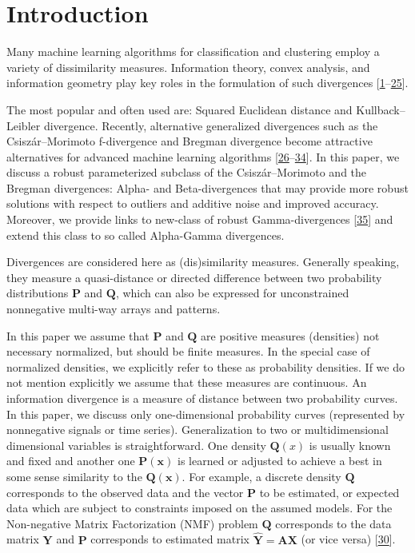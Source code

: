 \setcounter{section}{0}
\section{\texorpdfstring{Introduction}{Introduction}}
\label{sec1-entropy-12-01532}
Many machine learning algorithms for classification and clustering employ a variety of dissimilarity measures. Information theory, convex analysis, and information geometry play key roles in the formulation of such divergences [\hyperlink{B1-entropy-12-01532}{1}--\hyperlink{B25-entropy-12-01532}{25}].


The most popular and often used are: Squared Euclidean distance and Kullback–Leibler divergence. Recently, alternative generalized divergences such as the Csiszár–Morimoto f-divergence and Bregman divergence become attractive alternatives for advanced machine learning algorithms [\hyperlink{B26-entropy-12-01532}{26}--\hyperlink{B34-entropy-12-01532}{34}]. In this paper, we discuss a robust parameterized subclass of the Csiszár–Morimoto and the Bregman divergences: Alpha- and Beta-divergences that may provide more robust solutions with respect to outliers and additive noise and improved accuracy. Moreover, we provide links to new-class of robust Gamma-divergences [\hyperlink{B35-entropy-12-01532}{35}] and extend this class to so called Alpha-Gamma divergences.


Divergences are considered here as (dis)similarity measures. Generally speaking, they measure a quasi-distance or directed difference between two probability distributions \(\mathbf{P}\) and \(\mathbf{Q}\), which can also be expressed for unconstrained nonnegative multi-way arrays and patterns.


In this paper we assume that \(\mathbf{P}\) and \(\mathbf{Q}\) are positive measures (densities) not necessary normalized, but should be finite measures. In the special case of normalized densities, we explicitly refer to these as probability densities. If we do not mention explicitly we assume that these measures are continuous. An information divergence is a measure of distance between two probability curves. In this paper, we discuss only one-dimensional probability curves (represented by nonnegative signals or time series). Generalization to two or multidimensional dimensional variables is straightforward. One density \(\mathbf{Q}(x)\) is usually known and fixed and another one \(\mathbf{P}(\mathbf{x})\) is learned or adjusted to achieve a best in some sense similarity to the \(\mathbf{Q}(\mathbf{x})\). For example, a discrete density \(\mathbf{Q}\) corresponds to the observed data and the vector \(\mathbf{P}\) to be estimated, or expected data which are subject to constraints imposed on the assumed models. For the Non-negative Matrix Factorization (NMF) problem \(\mathbf{Q}\) corresponds to the data matrix \(\mathbf{Y}\) and \(\mathbf{P}\) corresponds to estimated matrix \(\hat{\mathbf{Y}} = \mathbf{A}\mathbf{X}\) (or vice versa) [\hyperlink{B30-entropy-12-01532}{30}].


